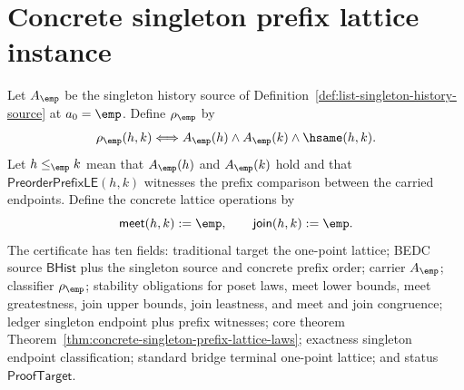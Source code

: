 \section{Concrete singleton prefix lattice instance}
\label{sec:lattice-concrete-singleton-prefix-instance}

\begin{definition}
\label{def:concrete-singleton-prefix-lattice-instance}
Let $A_{\emp}$ be the singleton history source of
Definition~\ref{def:list-singleton-history-source} at $a_0=\emp$. Define
$\rho_{\emp}$ by
$$
\rho_{\emp}(h,k)\Longleftrightarrow
A_{\emp}(h)\land A_{\emp}(k)\land\hsame(h,k).
$$
Let $h\le_{\emp} k$ mean that $A_{\emp}(h)$ and $A_{\emp}(k)$ hold and that
$\mathsf{PreorderPrefixLE}(h,k)$ witnesses the prefix comparison between the
carried endpoints. Define the concrete lattice operations by
$$
\mathsf{meet}(h,k):=\emp,\qquad
\mathsf{join}(h,k):=\emp.
$$
The certificate has ten fields: traditional target the one-point lattice; BEDC
source $\mathsf{BHist}$ plus the singleton source and concrete prefix order;
carrier $A_{\emp}$; classifier $\rho_{\emp}$; stability obligations for poset
laws, meet lower bounds, meet greatestness, join upper bounds, join leastness,
and meet and join congruence; ledger singleton endpoint plus prefix witnesses;
core theorem Theorem~\ref{thm:concrete-singleton-prefix-lattice-laws};
exactness singleton endpoint classification; standard bridge terminal
one-point lattice; and status $\mathsf{ProofTarget}$.
\end{definition}

